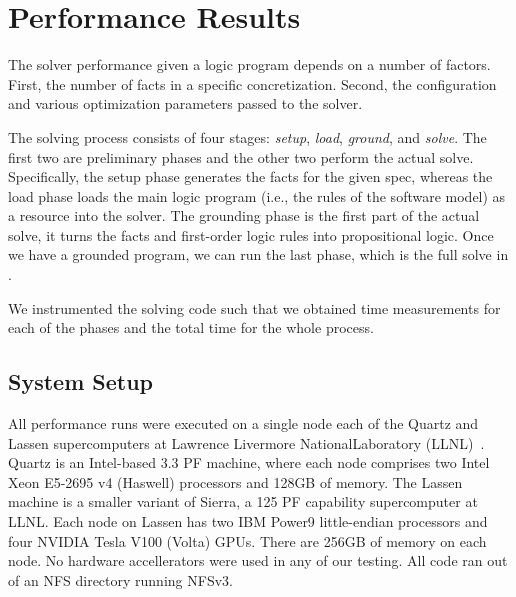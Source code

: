 \section{Performance Results}
\label{sec:perf-results}


The \clingo{} solver performance given a logic program depends on a number of factors. First, the number of facts in a specific concretization. Second, the configuration and various optimization parameters passed to the solver.

The solving process consists of four stages: \emph{setup}, \emph{load}, \emph{ground}, and \emph{solve}. The first two are preliminary phases and the other two perform the actual solve. Specifically, the setup phase generates the facts for the given spec, whereas the load phase loads the main logic program (i.e., the rules of the software model) as a resource into the solver. The grounding phase is the first part of the actual solve, it turns the facts and first-order logic rules into propositional logic. Once we have a grounded program, we can run the last phase, which is the full solve in \clingo{}.

We instrumented the solving code such that we obtained time measurements for each of the phases and the total time for the whole process.

% 

% 



\subsection{System Setup}

All performance runs were executed on a single node each of the Quartz and Lassen supercomputers at Lawrence Livermore NationalLaboratory (LLNL)~\cite{llnl:hpc}. Quartz is an Intel-based 3.3 PF machine, where each node comprises two Intel Xeon E5-2695 v4 (Haswell) processors and 128GB of memory. The Lassen machine is a smaller variant of Sierra, a 125 PF capability supercomputer at LLNL. Each node on Lassen has two IBM Power9 little-endian processors and four NVIDIA Tesla V100 (Volta) GPUs. There are 256GB of memory on each node. No hardware accellerators were used in any of our testing. All code ran out of an NFS directory running NFSv3.

